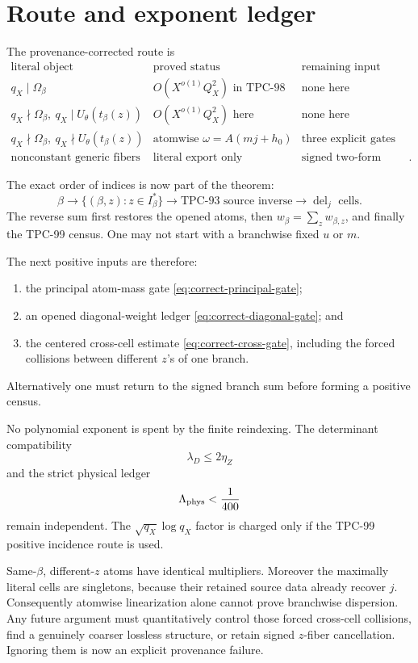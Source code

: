 \section{Route and exponent ledger}
\label{sec:route-ledger}

The provenance-corrected route is
\[
\begin{array}{c|c|c}
\text{literal object}&\text{proved status}&\text{remaining input}\\ \hline
q_X\mid\Omega_\beta
 &O(X^{o(1)}Q_X^2)\text{ in TPC-98}&\text{none here}\\
q_X\nmid\Omega_\beta,\ q_X\mid U_\theta(t_\beta(z))
 &O(X^{o(1)}Q_X^2)\text{ here}&\text{none here}\\
q_X\nmid\Omega_\beta,\ q_X\nmid U_\theta(t_\beta(z))
 &\text{atomwise }\omega=A(mj+h_0)
 &\text{three explicit gates}\\
\text{nonconstant generic fibers}
 &\text{literal export only}
 &\text{signed two-form cancellation}.
\end{array}
\]

The exact order of indices is now part of the theorem:
\[
 \beta
 \longrightarrow
 \{(\beta,z):z\in I_\beta^\ast\}
 \longrightarrow
 \text{TPC-93 source inverse}
 \longrightarrow
 \operatorname{del}_j\text{ cells}.
\]
The reverse sum first restores the opened atoms, then
\(w_\beta=\sum_z w_{\beta,z}\), and finally the TPC-99 census.  One
may not start with a branchwise fixed \(u\) or \(m\).

The next positive inputs are therefore:
\begin{enumerate}[leftmargin=2em]
\item the principal atom-mass gate
  \eqref{eq:correct-principal-gate};
\item an opened diagonal-weight ledger
  \eqref{eq:correct-diagonal-gate}; and
\item the centered cross-cell estimate
  \eqref{eq:correct-cross-gate}, including the forced collisions
  between different \(z\)'s of one branch.
\end{enumerate}
Alternatively one must return to the signed branch sum before
forming a positive census.

No polynomial exponent is spent by the finite reindexing.  The
determinant compatibility
\[
 \lambda_D\le2\eta_Z
\]
and the strict physical ledger
\[
 \Lambda_{\rm phys}<\frac1{400}
\]
remain independent.  The
\(\sqrt{q_X}\log q_X\) factor is charged only if the TPC-99 positive
incidence route is used.

\begin{remark}
Same-\(\beta\), different-\(z\) atoms have identical multipliers.
Moreover the maximally literal cells are singletons, because their
retained source data already recover \(j\).  Consequently atomwise
linearization alone cannot prove branchwise dispersion.  Any future
argument must quantitatively control those forced cross-cell
collisions, find a genuinely coarser lossless structure, or retain
signed \(z\)-fiber cancellation.  Ignoring them is now an explicit
provenance failure.
\end{remark}
